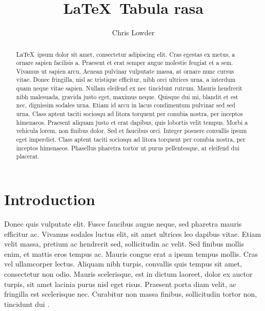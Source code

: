 \documentclass[]{aastex61}
\begin{document}
\title{\LaTeX\ Tabula rasa}


\author[0000-0001-8318-8229]{Chris Lowder}

\begin{abstract}

\LaTeX\ ipsum dolor sit amet, consectetur adipiscing elit. Cras egestas ex metus, a ornare sapien facilisis a. Praesent et erat semper augue molestie feugiat et a sem. Vivamus ut sapien arcu. Aenean pulvinar vulputate massa, at ornare nunc cursus vitae. Donec fringilla, nisl ac tristique efficitur, nibh orci ultrices urna, a interdum quam neque vitae sapien. Nullam eleifend ex nec tincidunt rutrum. Mauris hendrerit nibh malesuada, gravida justo eget, maximus neque. Quisque dui mi, blandit et est nec, dignissim sodales urna. Etiam id arcu in lacus condimentum pulvinar sed sed urna. Class aptent taciti sociosqu ad litora torquent per conubia nostra, per inceptos himenaeos. Praesent aliquam justo et erat dapibus, quis lobortis velit tempus. Morbi a vehicula lorem, non finibus dolor. Sed et faucibus orci. Integer posuere convallis ipsum eget imperdiet. Class aptent taciti sociosqu ad litora torquent per conubia nostra, per inceptos himenaeos. Phasellus pharetra tortor ut purus pellentesque, at eleifend dui placerat.

\end{abstract}

\section{Introduction} \label{sec:introduction}

Donec quis vulputate elit. Fusce faucibus augue neque, sed pharetra mauris efficitur ac. Vivamus sodales luctus elit, sit amet ultrices leo dapibus vitae. Etiam velit massa, pretium ac hendrerit sed, sollicitudin ac velit. Sed finibus mollis enim, et mattis eros tempus ac. Mauris congue erat a ipsum tempus mollis. Cras vel ullamcorper lectus. Aliquam nibh turpis, convallis quis tempus sit amet, consectetur non odio. Mauris scelerisque, est in dictum laoreet, dolor ex auctor turpis, sit amet lacinia purus nisl eget risus. Praesent porta diam velit, ac fringilla est scelerisque nec. Curabitur non massa finibus, sollicitudin tortor non, tincidunt dui \citep{1859MNRAS..20...13C}.
\end{document}
